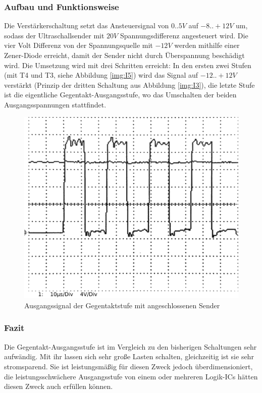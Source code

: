 \subsubsection{Aufbau und Funktionsweise}
Die Verstärkerschaltung setzt das Ansteuersignal von $0..5V$ auf $-8..+12V$ um, sodass der Ultraschallsender mit $20V$ Spannungsdifferenz angesteuert wird. Die vier Volt Differenz von der Spannungsquelle mit $-12V$ werden mithilfe einer Zener-Diode erreicht, damit der Sender nicht durch Überspannung beschädigt wird. Die Umsetzung wird mit drei Schritten erreicht: In den ersten zwei Stufen (mit T4 und T3, siehe Abbildung \ref{img:I5}) wird das Signal auf $-12..+12V$ verstärkt (Prinzip der dritten Schaltung aus Abbildung \ref{img:I3}), die letzte Stufe ist die eigentliche Gegentakt-Ausgangsstufe, wo das Umschalten der beiden Ausgangsspannungen stattfindet.
\begin{figure}[H]
\centering
\includegraphics[width=1\textwidth]{oszi/15-04-30/1.png}
\caption{Ausgangssignal der Gegentaktstufe mit angeschlossenen Sender} \label{img:I8}
\end{figure}

\subsubsection{Fazit}
Die Gegentakt-Ausgangsstufe ist im Vergleich zu den bisherigen Schaltungen sehr aufwändig. Mit ihr lassen sich sehr große Lasten schalten, gleichzeitig ist sie sehr stromsparend. Sie ist leistungsmäßig für diesen Zweck jedoch überdimensioniert, die leistungsschwächere Ausgangsstufe von einem oder mehreren Logik-ICs hätten diesen Zweck auch erfüllen können.


